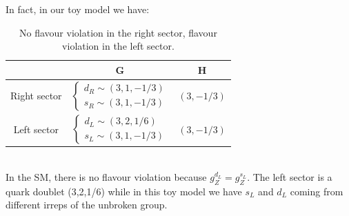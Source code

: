 \documentclass[../main.tex]{subfiles}
\begin{document}
In fact, in our toy model we have:
\begin{table}[h]
    \centering
    \begin{tabular}{c|cc}
    \hline
     & G & H \\
     \hline
     Right sector & $\begin{cases}
     d_R\sim(3,1,-1/3)\\
     s_R\sim(3,1,-1/3)
     \end{cases}$ & $(3,-1/3)$\\
     \hline
     Left sector & $\begin{cases}
     d_L\sim(3,2,1/6)\\
     s_L\sim(3,1,-1/3)
     \end{cases}$ & $(3,-1/3)$\\
     \hline
    \end{tabular}
    \caption{No flavour violation in the right sector, flavour violation in the left sector.}
    \label{tab:my_label}
\end{table}\\
In the SM, there is no flavour violation because $g_Z^{d_L}=g_Z^{s_L}$. The left sector is a quark doublet (3,2,1/6) while in this toy model we have $s_L$ and $d_L$ coming from different irreps of the unbroken group.
\end{document}
